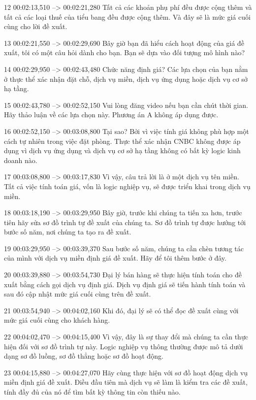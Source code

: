 12
00:02:13,510 --> 00:02:21,280
Tất cả các khoản phụ phí đều được cộng thêm và tất cả các loại thuế của tiểu bang đều được cộng thêm.  Và đây sẽ là mức giá cuối cùng cho lời đề xuất.

13
00:02:21,550 --> 00:02:29,690
Bây giờ bạn đã hiểu cách hoạt động của giá đề xuất, tôi có một câu hỏi dành cho bạn.  Bạn sẽ dựa vào đối tượng mô hình nào?

14
00:02:29,950 --> 00:02:43,480
Chức năng định giá?  Các lựa chọn của bạn nằm ở thực thể xác nhận đặt chỗ, dịch vụ miền, dịch vụ ứng dụng hoặc dịch vụ cơ sở hạ tầng.

15
00:02:43,780 --> 00:02:52,150
Vui lòng đăng video nếu bạn cần chút thời gian.  Hãy thảo luận về các lựa chọn này.  Phương án A không áp dụng được.

16
00:02:52,150 --> 00:03:08,800
Tại sao?  Bởi vì việc tính giá không phù hợp một cách tự nhiên trong việc đặt phòng.  Thực thể xác nhận CNBC không được áp dụng vì dịch vụ ứng dụng và dịch vụ cơ sở hạ tầng không có bất kỳ logic kinh doanh nào.

17
00:03:08,800 --> 00:03:17,830
Vì vậy, câu trả lời là ở một dịch vụ tên miền.  Tất cả việc tính toán giá, vốn là logic nghiệp vụ, sẽ được triển khai trong dịch vụ miền.

18
00:03:18,190 --> 00:03:29,950
Bây giờ, trước khi chúng ta tiến xa hơn, trước tiên hãy sửa sơ đồ trình tự đề xuất của chúng ta.  Sơ đồ trình tự được hướng tới bước số năm, nơi chúng ta tạo ra đề xuất.

19
00:03:29,950 --> 00:03:39,370
Sau bước số năm, chúng ta cần chèn tương tác của mình với dịch vụ miền định giá đề xuất.  Hãy để tôi thêm bước ở đây.

20
00:03:39,880 --> 00:03:54,730
Đại lý bán hàng sẽ thực hiện tính toán cho đề xuất bằng cách gọi dịch vụ định giá.  Dịch vụ định giá sẽ tiến hành tính toán và sau đó cập nhật mức giá cuối cùng trên đề xuất.

21
00:03:54,940 --> 00:04:02,160
Khi đó, đại lý sẽ có thể đọc đề xuất cùng với mức giá cuối cùng cho khách hàng.

22
00:04:02,470 --> 00:04:15,400
Vì vậy, đây là sự thay đổi mà chúng ta cần thực hiện đối với sơ đồ trình tự này.  Logic nghiệp vụ thông thường được mô tả dưới dạng sơ đồ luồng, sơ đồ thẳng hoặc sơ đồ hoạt động.

23
00:04:15,880 --> 00:04:27,070
Hãy cùng thực hiện với sơ đồ hoạt động dịch vụ miền định giá đề xuất.  Điều đầu tiên mà dịch vụ sẽ làm là kiểm tra các đề xuất, tính đầy đủ của nó để tìm bất kỳ thông tin còn thiếu nào.

